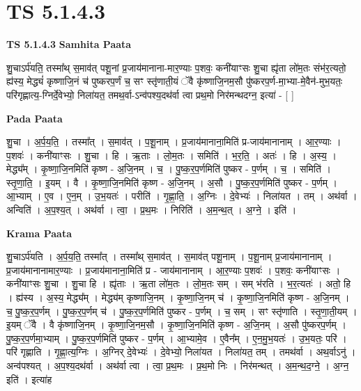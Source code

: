 \documentclass[17pt]{extarticle}
\begin{document}
\section{ TS 5.1.4.3 }

\textbf{TS 5.1.4.3 } \newline
\textbf{Samhita Paata} \newline

शु॒चाऽर्प॑यति॒ तस्मा᳚थ् स॒माव॑त् पशू॒नां प्र॒जाय॑मानाना-मार॒ण्याः प॒शवः॒ कनी॑याꣳसः शु॒चा ह्यृ॑ता लो॑म॒तः संभ॑र॒त्यतो॒ ह्य॑स्य॒ मेद्ध्यं॑ कृष्णाजि॒नं च॑ पुष्करप॒र्णं च॒ सꣳ स्तृ॑णाती॒यं ॅवै कृ॑ष्णाजि॒नम॒सौ पु॑ष्करप॒र्ण-मा॒भ्या-मे॒वैन॑-मुभ॒यतः॒ परि॑गृह्णात्य॒-ग्निर्दे॒वेभ्यो॒ निला॑यत॒ तमथ॒र्वा-ऽन्व॑पश्य॒दथ॑र्वा त्वा प्रथ॒मो निर॑मन्थदग्न॒ इत्या॑ - [  ] \newline

\textbf{Pada Paata} \newline

शु॒चा । अ॒र्प॒य॒ति॒ । तस्मा᳚त् । स॒माव॑त् । प॒शू॒नाम् । प्र॒जाय॑मानाना॒मिति॑ प्र-जाय॑मानानाम् । आ॒र॒ण्याः । प॒शवः॑ । कनी॑याꣳसः । शु॒चा । हि । ऋ॒ताः । लो॒म॒तः । समिति॑ । भ॒र॒ति॒ । अतः॑ । हि । अ॒स्य॒ । मेद्ध्य᳚म् । कृ॒ष्णा॒जि॒नमिति॑ कृष्ण - अ॒जि॒नम् । च॒ । पु॒ष्क॒र॒प॒र्णमिति॑ पुष्कर - प॒र्णम् । च॒ । समिति॑ । स्तृ॒णा॒ति॒ । इ॒यम् । वै । कृ॒ष्णा॒जि॒नमिति॑ कृष्ण - अ॒जि॒नम् । अ॒सौ । पु॒ष्क॒र॒प॒र्णमिति॑ पुष्कर - प॒र्णम् । आ॒भ्याम् । ए॒व । ए॒न॒म् । उ॒भ॒यतः॑ । परीति॑ । गृ॒ह्णा॒ति॒ । अ॒ग्निः । दे॒वेभ्यः॑ । निला॑यत । तम् । अथ॑र्वा । अन्विति॑ । अ॒प॒श्य॒त् । अथ॑र्वा । त्वा॒ । प्र॒थ॒मः । निरिति॑ । अ॒म॒न्थ॒त् । अ॒ग्ने॒ । इति॑ ।  \newline


\textbf{Krama Paata} \newline

शु॒चाऽर्प॑यति । अ॒र्प॒य॒ति॒ तस्मा᳚त् । तस्मा᳚थ् स॒माव॑त् । स॒माव॑त् पशू॒नाम् । प॒शू॒नाम् प्र॒जाय॑मानानाम् । प्र॒जाय॑मानानामार॒ण्याः । प्र॒जाय॑मानाना॒मिति॑ प्र - जाय॑मानानाम् । आ॒र॒ण्याः प॒शवः॑ । 
प॒शवः॒ कनी॑याꣳसः । कनी॑याꣳसः शु॒चा । शु॒चा हि । ह्यृ॑ताः । ऋ॒ता लो॑म॒तः । लो॒म॒तः सम् । सम् भ॑रति । भ॒र॒त्यतः॑ । अतो॒ हि । ह्य॑स्य । अ॒स्य॒ मेद्ध्य᳚म् । मेद्ध्य॑म् कृष्णाजि॒नम् । कृ॒ष्णा॒जि॒नम् च॑ । कृ॒ष्णा॒जि॒नमिति॑ कृष्ण - अ॒जि॒नम् । च॒ पु॒ष्क॒र॒प॒र्णम् । पु॒ष्क॒र॒प॒र्णम् च॑ । पु॒ष्क॒र॒प॒र्णमिति॑ पुष्कर - प॒र्णम् । च॒ सम् । सꣳ स्तृ॑णाति । स्तृ॒णा॒ती॒यम् । 
इ॒यम् ॅवै । वै कृ॑ष्णाजि॒नम् । कृ॒ष्णा॒जि॒नम॒सौ । कृ॒ष्णा॒जि॒नमिति॑ कृष्ण - अ॒जि॒नम् । अ॒सौ पु॑ष्करप॒र्णम् । पु॒ष्क॒र॒प॒र्णमा॒भ्याम् । पु॒ष्क॒र॒प॒र्णमिति॑ पुष्कर - प॒र्णम् । आ॒भ्यामे॒व । ए॒वैन᳚म् । ए॒न॒मु॒भ॒यतः॑ । उ॒भ॒यतः॒ परि॑ । परि॑ गृह्णाति । गृ॒ह्णा॒त्य॒ग्निः । अ॒ग्निर् दे॒वेभ्यः॑ । दे॒वेभ्यो॒ निला॑यत । निला॑यत॒ तम् । तमथ॑र्वा । अथ॒र्वाऽनु॑ । अन्व॑पश्यत् । अ॒प॒श्य॒दथ॑र्वा । अथ॑र्वा त्वा । त्वा॒ प्र॒थ॒मः । प्र॒थ॒मो निः । निर॑मन्थत् । अ॒म॒न्थ॒द॒ग्ने॒ । अ॒ग्न॒ इति॑ । इत्या॑ह \newline
\end{document}
